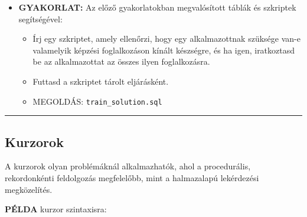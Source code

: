 \documentclass[
  magyar,
]{article}
\providecommand{\tightlist}{%
  \setlength{\itemsep}{0pt}\setlength{\parskip}{0pt}}
\begin{document}
\begin{itemize}
\tightlist
\item
  \textbf{GYAKORLAT:} Az előző gyakorlatokban megvalósított táblák és
  szkriptek segítségével:

  \begin{itemize}
  \tightlist
  \item
    Írj egy szkriptet, amely ellenőrzi, hogy egy alkalmazottnak szüksége
    van-e valamelyik képzési foglalkozáson kínált készségre, és ha igen,
    iratkoztasd be az alkalmazottat az összes ilyen foglalkozásra.
  \item
    Futtasd a szkriptet tárolt eljárásként.
  \item
    MEGOLDÁS: \texttt{train\_solution.sql}
  \end{itemize}
\end{itemize}

\begin{center}\rule{0.5\linewidth}{0.5pt}\end{center}

\subsection{Kurzorok}\label{kurzorok}

A kurzorok olyan problémáknál alkalmazhatók, ahol a procedurális,
rekordonkénti feldolgozás megfelelőbb, mint a halmazalapú lekérdezési
megközelítés.

\textbf{PÉLDA} kurzor szintaxisra:
\end{document}
